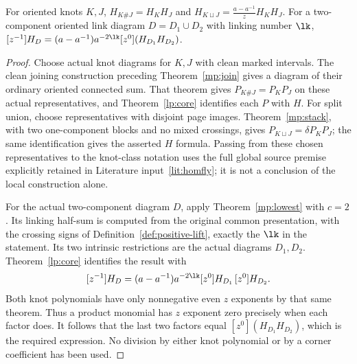 \begin{lemma}\label{lem:homflyrows}\leanok
For oriented knots $K,J$, $H_{K\#J}=H_KH_J$ and
$H_{K\sqcup J}=\frac{a-a^{-1}}zH_KH_J$. For a two-component oriented link
diagram $D=D_1\cup D_2$ with linking number $\lk$,
$[z^{-1}]H_D=(a-a^{-1})a^{-2\lk}[z^0](H_{D_1}H_{D_2})$.

\end{lemma}
\begin{proof}\leanok{}
Choose actual knot diagrams for $K,J$ with clean marked intervals. The
clean joining construction preceding Theorem~\ref{mp:join} gives a diagram
of their ordinary oriented connected sum. That theorem gives
$P_{K\#J}=P_KP_J$ on these actual representatives, and
Theorem~\ref{lp:core} identifies each $P$ with $H$. For split union, choose
representatives with disjoint page images. Theorem~\ref{mp:stack}, with
two one-component blocks and no mixed crossings, gives
$P_{K\sqcup J}=\delta P_KP_J$; the same identification gives the asserted
$H$ formula. Passing from these chosen representatives to the knot-class
notation uses the full global source premise explicitly retained in
Literature input~\ref{lit:homfly}; it is not a conclusion of the local
construction alone.

For the actual two-component diagram $D$, apply Theorem~\ref{mp:lowest}
with $c=2$. Its linking half-sum is computed from the original common
presentation, with the crossing signs of
Definition~\ref{def:positive-lift}, exactly the $\lk$ in the statement.
Its two intrinsic restrictions are the actual diagrams $D_1,D_2$.
Theorem~\ref{lp:core} identifies the result with
\[
[z^{-1}]H_D=(a-a^{-1})a^{-2\lk}[z^0]H_{D_1}\,[z^0]H_{D_2}.
\]
Both knot polynomials have only nonnegative even $z$ exponents by that
same theorem. Thus a product monomial has $z$ exponent zero precisely
when each factor does. It follows that the last two factors equal
$[z^0](H_{D_1}H_{D_2})$, which is the required expression. No division
by either knot polynomial or by a corner coefficient has been used.
\end{proof}

